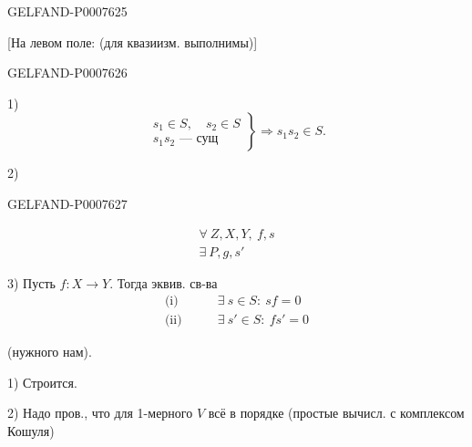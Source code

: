 \begin{GelfandAdjacentEvidence}{GELFAND-P000762}{5}


[На левом поле: (для квазиизм. выполнимы)]
\end{GelfandAdjacentEvidence}
\begin{GelfandAdjacentEvidence}{GELFAND-P000762}{6}


1)
\[
\left.
\begin{gathered}
s_1\in S,\quad s_2\in S\\
s_1s_2\text{ --- сущ}
\end{gathered}
\right\}\Rightarrow s_1s_2\in S.
\]

2)
\end{GelfandAdjacentEvidence}
\begin{GelfandAdjacentEvidence}{GELFAND-P000762}{7}

\[
\begin{gathered}
\forall\ Z,X,Y,\ f,s\\
\exists\ P,g,s'
\end{gathered}
\]

3) Пусть \(f:X\longrightarrow Y\). Тогда эквив. св-ва
\begin{align*}
\text{(i)}\qquad&\exists\ s\in S:\ sf=0\\
\text{(ii)}\qquad&\exists\ s'\in S:\ fs'=0
\end{align*}

\end{GelfandAdjacentEvidence}



(нужного нам).

1) Строится.

2) Надо пров., что для 1-мерного \(V\) всё в порядке
(простые вычисл. с комплексом Кошуля)

